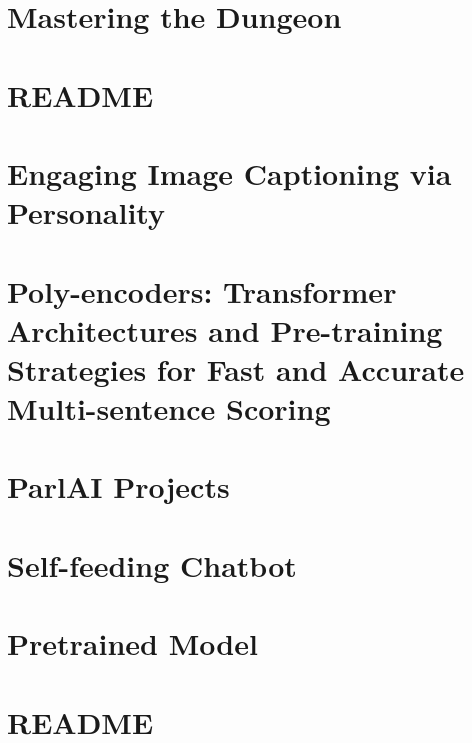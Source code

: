 \documentclass[twoside]{book}
\newcommand{\+}{\discretionary{\mbox{\scriptsize$\hookleftarrow$}}{}{}}
\begin{document}
\chapter{Mastering the Dungeon}
\label{md_projects_mastering_the_dungeon_README}

\chapter{R\+E\+A\+D\+ME}
\label{md_projects_personachat_README}

\chapter{Engaging Image Captioning via Personality}
\label{md_projects_personality_captions_README}

\chapter{Poly-\/encoders\+: Transformer Architectures and Pre-\/training Strategies for Fast and Accurate Multi-\/sentence Scoring}
\label{md_projects_polyencoder_README}

\chapter{Parl\+AI Projects}
\label{md_projects_README}

\chapter{Self-\/feeding Chatbot}
\label{md_projects_self_feeding_README}

\chapter{Pretrained Model}
\label{md_projects_twitter_seq2seq_README}

\chapter{R\+E\+A\+D\+ME}
\label{md_projects_wizard_of_wikipedia_mturk_evaluation_task_README}

\end{document}
